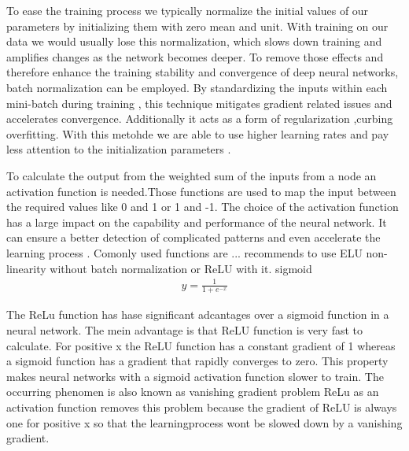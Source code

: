 \documentclass[
a4paper, 
12pt,
grayscalebody, %
abstract=on,
twoside, BCOR10mm, 12pt, DIV13,headinclude, footexclude, final, abstracton, openright
]{ibireprt}
\numberwithin{equation}{chapter}
\numberwithin{table}{chapter}
\numberwithin{figure}{chapter}
\numberwithin{algorithm}{chapter}
\numberwithin{example}{chapter}
\numberwithin{example}{chapter}
\begin{document}
To ease the training process we typically normalize the initial values of our parameters by initializing them with zero mean and unit. With training on our data we would usually lose this normalization, which slows down training and amplifies changes as the network becomes deeper. %
 To remove those effects and therefore enhance the training stability and convergence of deep neural networks, batch normalization\cite{Ioffe2015} can be employed. By standardizing the inputs within each mini-batch during training , this technique mitigates gradient related issues and accelerates convergence. Additionally it acts as a form of regularization ,curbing overfitting. With this metohde we are able to use higher learning rates and pay less attention to the initialization parameters \cite{Ruder2016}.  
 
 
To calculate the output from the weighted sum of the inputs from a node an activation function is needed.Those functions are used to map the input between the required values like 0 and 1 or 1 and -1.  The choice of the activation function has a large impact on the capability and performance of the neural network. It can ensure a better detection of complicated patterns and even accelerate the learning process \cite{Khan2020}. Comonly used functions are ... \cite{Mishkin2017} recommends to use ELU non-linearity without batch normalization or ReLU with it.
sigmoid
\begin{align}
	y = \frac{1}{1+e^{-x}}
\end{align}

The ReLu function has hase significant adcantages over a sigmoid function in a neural network. The mein advantage is that ReLU function is very fast to calculate. For positive x the ReLU function has a constant gradient of 1 whereas a sigmoid function has a gradient that rapidly converges to zero. This property makes neural networks with a sigmoid activation function slower to train. The occurring phenomen is also known as vanishing gradient problem %
ReLu as an activation function removes this problem because the gradient of ReLU is always one for positive x so that the learningprocess wont be slowed down by a vanishing gradient. 

 
\end{document}
